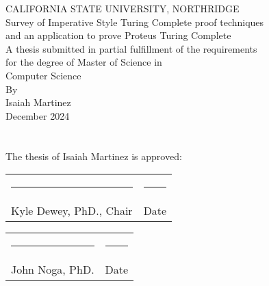 \documentclass[12pt]{report} %
\begin{document}
    \begin{titlepage}
        \centering
        CALIFORNIA STATE UNIVERSITY, NORTHRIDGE\\
        [1.5in]
        Survey of Imperative Style Turing Complete proof techniques\\
        and an application to prove Proteus Turing Complete\\
        [1.5in]
        A thesis submitted in partial fulfillment of the requirements\\
        for the degree of Master of Science in\\
        Computer Science\\
        [0.5in]
        By\\
        [0.25in]
        Isaiah Martinez\\
        [1.5in]
        December 2024
    \end{titlepage}

    \newpage
    \setcounter{page}{2} %

    \chapter*{}\label{chapter:SignPage}
        \vspace*{3in}
        
        \hspace*{0.9in}
        The thesis of Isaiah Martinez is approved:
        \vspace{1in}

        \begin{center}
            \begin{tabular}{p{3in} p{1in}}
                \rule{3in}{0.4pt} & \rule{1in}{0.4pt}\\
                Kyle Dewey, PhD., Chair & Date \\
            \end{tabular}
        \end{center}

        \begin{center}
            \begin{tabular}{p{3in} p{1in}}
                \rule{3in}{0.4pt} & \rule{1in}{0.4pt}\\
                John Noga, PhD. & Date \\
            \end{tabular}
        \end{center}
\end{document}
